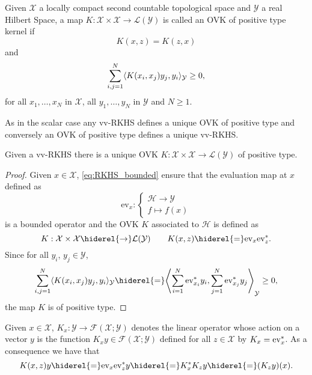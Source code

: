 \begin{definition}
\label{def:reproducing_kernel_real}
Given $\mathcal{X}$ a locally compact second countable topological space and $\mathcal{Y}$ a real Hilbert Space, a map $K:\mathcal{X}\times\mathcal{X}\to\mathcal{L}(\mathcal{Y})$ is called an \acl{OVK} of positive type kernel if 
\begin{dmath}
K(x,z)=K(z,x)
\end{dmath}
and
\begin{dmath}
\sum_{i,j=1}^N\inner{K(x_i,x_j)y_j,y_i}_{\mathcal{Y}}\ge 0,
\end{dmath}
for all $x_1,\hdots,x_N$ in $\mathcal{X}$, all $y_1,\hdots,y_N$ in $\mathcal{Y}$ and $N\ge 1$.
\label{def:ovk_real}
\end{definition}
As in the scalar case any \acl{vv-RKHS} defines a unique \acl{OVK} of positive type and conversely an \acl{OVK} of positive type defines a unique \acl{vv-RKHS}.
\begin{proposition}
\label{pr:unique_rkhs}
Given a \acl{vv-RKHS} there is a unique \acl{OVK} $K:\mathcal{X}\times\mathcal{X}\to\mathcal{L}(\mathcal{Y})$ of positive type.
\end{proposition}
\begin{proof}
Given $x\in\mathcal{X}$, \cref{eq:RKHS_bounded} ensure that the evaluation map at $x$ defined as
\begin{dmath*}
\text{ev}_x:\begin{cases}
\mathcal{H} \to \mathcal{Y} \\
f\mapsto f(x)
\end{cases}
\end{dmath*}
is a bounded operator and the \acl{OVK} $K$ associated to $\mathcal{H}$ is defined as
\begin{dmath*}
K:\mathcal{X}\times\mathcal{X}\hiderel{\to}\mathcal{L}(\mathcal{Y}) \qquad K(x,z)\hiderel{=}\text{ev}_x\text{ev}_z^\adjoint.
\end{dmath*}
Since for all $y_i$, $y_j\in\mathcal{Y}$,
\begin{dmath*}
\sum_{i,j=1}^N\inner{K(x_i,x_j)y_j,y_i}_{\mathcal{Y}}\hiderel{=}
\inner*{\sum_{i=1}^N\text{ev}^\adjoint_{x_i}y_i, \sum_{j=1}^N\text{ev}^\adjoint_{x_j}y_j}_{\mathcal{Y}} \ge 0,
\end{dmath*}
the map $K$ is of positive type.
\end{proof}
Given $x\in\mathcal{X}$, $K_x:\mathcal{Y}\to\mathcal{F}(\mathcal{X};\mathcal{Y})$ denotes the linear operator whose action on a vector $y$ is the function $K_xy\in\mathcal{F}(\mathcal{X};\mathcal{Y})$ defined for all $z\in\mathcal{X}$ by $K_x=\text{ev}_x^*$. As a consequence we have that
\begin{dmath}
\label{eq:trivial_feature_op}
K(x,z)y\hiderel{=}\text{ev}_x\text{ev}_z^\adjoint y\hiderel{=}K_x^\adjoint K_zy\hiderel{=}(K_zy)(x).
\end{dmath}

